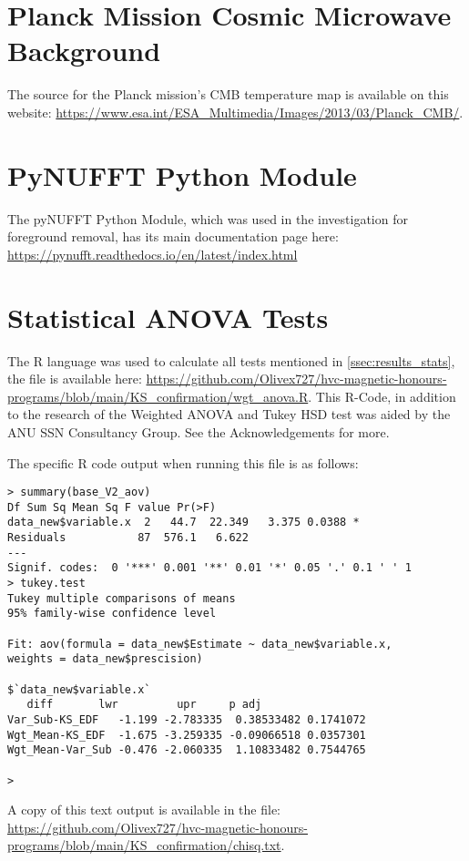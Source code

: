 \section{Planck Mission Cosmic Microwave Background}
\label{sec:appendixC}

The source for the Planck mission's CMB temperature map is available on this website: \url{https://www.esa.int/ESA_Multimedia/Images/2013/03/Planck_CMB/}.

\section{PyNUFFT Python Module}
\label{sec:appendixD}

The pyNUFFT Python Module, which was used in the investigation for foreground removal, has its main documentation page here: \url{https://pynufft.readthedocs.io/en/latest/index.html}

\newpage

\section{Statistical ANOVA Tests}
\label{sec:appendixE}

The R language was used to calculate all tests mentioned in \ref{ssec:results_stats}, the file is available here: \url{https://github.com/Olivex727/hvc-magnetic-honours-programs/blob/main/KS_confirmation/wgt_anova.R}. This R-Code, in addition to the research of the Weighted ANOVA and Tukey HSD test was aided by the ANU SSN Consultancy Group. See the Acknowledgements for more.

The specific R code output when running this file is as follows:

\begin{verbatim}
> summary(base_V2_aov)
Df Sum Sq Mean Sq F value Pr(>F)  
data_new$variable.x  2   44.7  22.349   3.375 0.0388 *
Residuals           87  576.1   6.622                 
---
Signif. codes:  0 '***' 0.001 '**' 0.01 '*' 0.05 '.' 0.1 ' ' 1
> tukey.test
Tukey multiple comparisons of means
95% family-wise confidence level

Fit: aov(formula = data_new$Estimate ~ data_new$variable.x,
weights = data_new$prescision)

$`data_new$variable.x`
   diff       lwr         upr     p adj
Var_Sub-KS_EDF   -1.199 -2.783335  0.38533482 0.1741072
Wgt_Mean-KS_EDF  -1.675 -3.259335 -0.09066518 0.0357301
Wgt_Mean-Var_Sub -0.476 -2.060335  1.10833482 0.7544765

> 
\end{verbatim}

A copy of this text output is available in the file: \url{https://github.com/Olivex727/hvc-magnetic-honours-programs/blob/main/KS_confirmation/chisq.txt}.